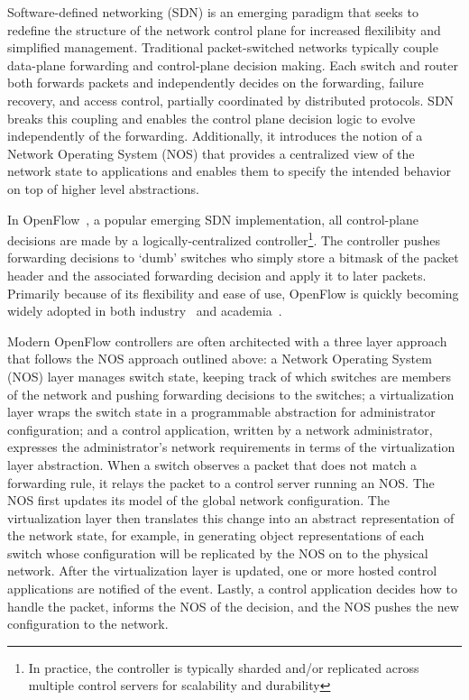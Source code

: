 Software-defined networking (SDN) is an emerging paradigm that seeks to redefine
the structure of the network control plane for increased flexilibity and
simplified management. Traditional packet-switched networks typically couple
data-plane forwarding and control-plane decision making. Each switch and router
both forwards packets and independently decides on the forwarding, failure
recovery, and access control, partially coordinated by distributed protocols.
SDN breaks this coupling and enables the control plane decision logic to evolve
independently of the forwarding. Additionally, it introduces the notion of a
Network Operating System (NOS) that provides a centralized view of the network
state to applications and enables them to specify the intended behavior on top
of higher level abstractions.

In OpenFlow~\cite{openflow}, a popular emerging SDN implementation, all
control-plane decisions are made by a logically-centralized
controller\footnote{In practice, the controller is typically sharded and/or
replicated across multiple control servers for scalability and durability}. The
controller pushes forwarding decisions to `dumb' switches who simply store a
bitmask of the packet header and the associated forwarding decision and apply it
to later packets. Primarily because of its flexibility and ease of use, OpenFlow
is quickly becoming widely adopted in both industry~\cite{nicirahomepage,
bigswitch} and academia~\cite{nox, pox, ethane}.

Modern OpenFlow controllers are often architected with a three layer approach
that follows the NOS approach outlined above: a Network Operating System (NOS)
layer manages switch state, keeping track of which switches are members of the
network and pushing forwarding decisions to the switches; a virtualization layer
wraps the switch state in a programmable abstraction for administrator
configuration; and a control application, written by a network administrator,
expresses the administrator's network requirements in terms of the
virtualization layer abstraction. When a switch observes a packet that does not
match a forwarding rule, it relays the packet to a control server running an
NOS. The NOS first updates its model of the global network configuration. The
virtualization layer then translates this change into an abstract representation
of the network state, for example, in generating object representations of each
switch whose configuration will be replicated by the NOS on to the physical
network. After the virtualization layer is updated, one or more hosted control
applications are notified of the event. Lastly, a control application decides
how to handle the packet, informs the NOS of the decision, and the NOS pushes
the new configuration to the network. 

